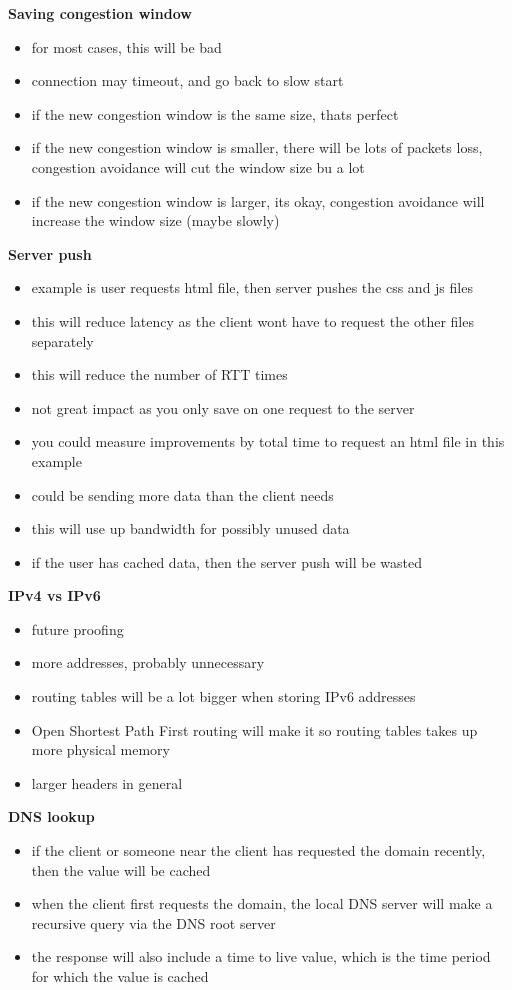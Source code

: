 \documentclass{article}
\begin{document}
\textbf{Saving congestion window}
\begin{itemize}
    \item for most cases, this will be bad
    \item connection may timeout, and go back to slow start
    \item if the new congestion window is the same size, thats perfect
    \item if the new congestion window is smaller, there will be lots of packets loss, congestion avoidance will cut the window size bu a lot
    \item if the new congestion window is larger, its okay, congestion avoidance will increase the window size (maybe slowly)
\end{itemize}


\textbf{Server push}
\begin{itemize}
    \item example is user requests html file, then server pushes the css and js files
    \item this will reduce latency as the client wont have to request the other files separately
    \item this will reduce the number of RTT times
    \item not great impact as you only save on one request to the server
    \item you could measure improvements by total time to request an html file in this example
    \item could be sending more data than the client needs
    \item this will use up bandwidth for possibly unused data
    \item if the user has cached data, then the server push will be wasted
\end{itemize}


\textbf{IPv4 vs IPv6}
\begin{itemize}
    \item future proofing
    \item more addresses, probably unnecessary
    \item routing tables will be a lot bigger when storing IPv6 addresses
    \item Open Shortest Path First routing will make it so routing tables takes up more physical memory
    \item larger headers in general
\end{itemize}


\textbf{DNS lookup}
\begin{itemize}
    \item if the client or someone near the client has requested the domain recently, then the value will be cached
    \item when the client first requests the domain, the local DNS server will make a recursive query via the DNS root server
    \item the response will also include a time to live value, which is the time period for which the value is cached
\end{itemize}
\end{document}
